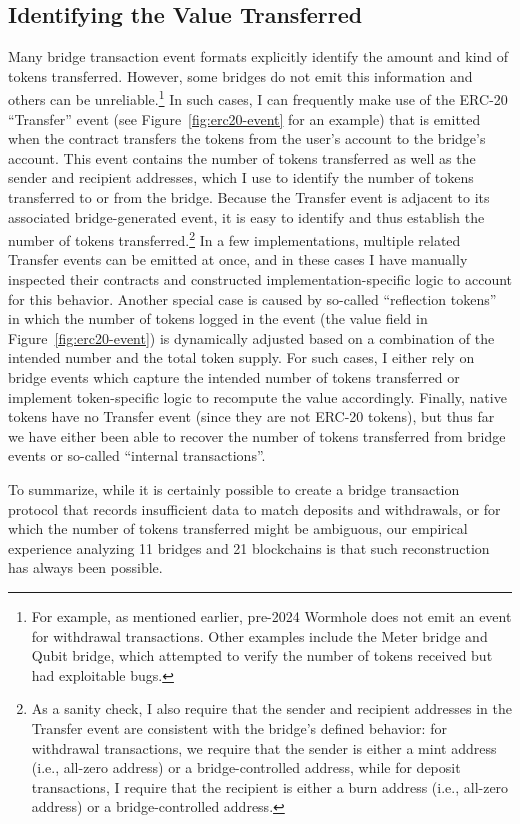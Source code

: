 \subsection{Identifying the Value Transferred}
Many bridge transaction event formats explicitly identify the amount
and kind of tokens transferred. However, some bridges do not emit this
information and others can be unreliable.\footnote{For example, as
  mentioned earlier, pre-2024 Wormhole does not emit an event for
  withdrawal transactions. Other examples include the Meter bridge and
  Qubit bridge, which attempted to verify the number of tokens
  received but had exploitable bugs.}  In such cases, I can
frequently make use of the ERC-20 ``Transfer'' event (see
Figure~\ref{fig:erc20-event} for an example) that is emitted when the
contract transfers the tokens from the user's account to the bridge's
account.  This event contains the number of tokens transferred as well
as the sender and recipient addresses, which I use to identify the
number of tokens transferred to or from the bridge.  Because the
Transfer event is adjacent to its associated bridge-generated event,
it is easy to identify and thus establish the number of tokens
transferred.\footnote{As a sanity check, I also require that the
  sender and recipient addresses in the Transfer event are consistent
  with the bridge's defined behavior: for withdrawal transactions, we
  require that the sender is either a mint address (i.e., all-zero
  address) or a bridge-controlled address, while for deposit
  transactions, I require that the recipient is either a burn address
  (i.e., all-zero address) or a bridge-controlled address.}  In a few
implementations, multiple related Transfer events can be emitted at
once, and in these cases I have manually inspected their contracts
and constructed implementation-specific logic to account for this
behavior.  Another special case is caused by so-called ``reflection
tokens'' in which the number of tokens logged in the event (the value
field in Figure~\ref{fig:erc20-event}) is dynamically adjusted based
on a combination of the intended number and the total token supply.
For such cases, I either rely on bridge events which capture the
intended number of tokens transferred or implement token-specific
logic to recompute the value accordingly.  Finally, native tokens have
no Transfer event (since they are not ERC-20 tokens), but thus far we
have either been able to recover the number of tokens transferred from
bridge events or so-called ``internal transactions''.

To summarize, while it is certainly possible to create a bridge
transaction protocol that records insufficient data to match deposits
and withdrawals, or for which the number of tokens transferred might
be ambiguous, our empirical experience analyzing 11 bridges and 21
blockchains is that such reconstruction has always been possible.


